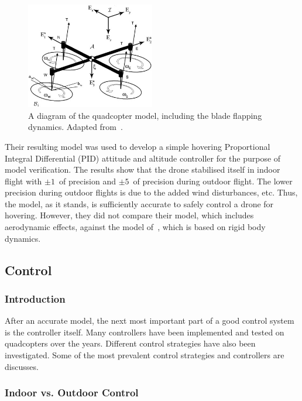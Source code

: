 \begin{figure}
  \centering
  \includegraphics[width=0.5\textwidth]{figures/chapter2/pounds_quad-model.jpg}
  \caption[A diagram of the quadcopter model, including the blade flapping dynamics.]{A diagram of the quadcopter model, including the blade flapping dynamics. Adapted from~\cite{Pounds2010c}.}
\label{fig:chap2-quad-model}
\end{figure}

Their resulting model was used to develop a simple hovering Proportional Integral Differential (PID) attitude and altitude controller for the purpose of model verification. The results show that the drone stabilised itself in indoor flight with $\pm1$\textdegree\ of precision and $\pm5$\textdegree\ of precision during outdoor flight. The lower precision during outdoor flights is due to the added wind disturbances, etc. Thus, the model, as it stands, is sufficiently accurate to safely control a drone for hovering. However, they did not compare their model, which includes aerodynamic effects, against the model of~\citeauthor{hamel2002dynamic}, which is based on rigid body dynamics. 

\subsection{Control}

\subsubsection{Introduction}

After an accurate model, the next most important part of a good control system is the controller itself. Many controllers have been implemented and tested on quadcopters over the years. Different control strategies have also been investigated. Some of the most prevalent control strategies and controllers are discusses.

\subsubsection{Indoor vs. Outdoor Control}

